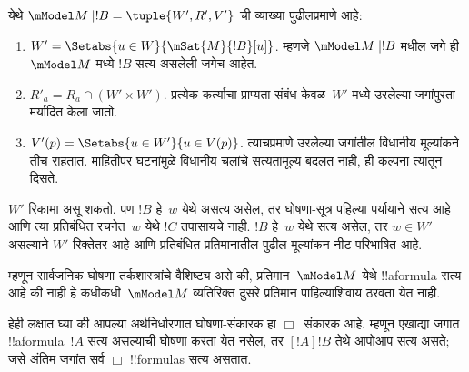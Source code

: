 \documentclass[../../../include/open-logic-section]{subfiles}
\begin{document}
\begin{defn}
\begin{enumerate}
  येथे $\mModel M \mid !B = \tuple{W', R', V'}$ ची
  व्याख्या पुढीलप्रमाणे आहे:
  \begin{enumerate}
    \item $W' = \Setabs{ u \in W}{\mSat{M}{!B}[u]}$.
      म्हणजे $\mModel M \mid !B$ मधील जगे ही~$\mModel M$
      मध्ये $!B$ सत्य असलेली जगेच आहेत.
    \item $R'_a = R_a \cap (W' \times W')$. प्रत्येक कर्त्याचा
      प्राप्यता संबंध केवळ~$W'$ मध्ये उरलेल्या जगांपुरता
      मर्यादित केला जातो.
    \item $V'(p) = \Setabs{ u \in W'}{u \in V(p) }$.
      त्याचप्रमाणे उरलेल्या जगांतील विधानीय मूल्यांकने
      तीच राहतात. माहितीपर घटनांमुळे विधानीय चलांचे
      सत्यतामूल्य बदलत नाही, ही कल्पना त्यातून दिसते.
  \end{enumerate}
  $W'$ रिकामा असू शकतो. पण $!B$ हे~$w$ येथे असत्य
  असेल, तर घोषणा-सूत्र पहिल्या पर्यायाने सत्य आहे आणि
  त्या प्रतिबंधित रचनेत~$w$ येथे $!C$ तपासायचे नाही.
  $!B$ हे~$w$ येथे सत्य असेल, तर $w\in W'$ असल्याने
  $W'$ रिक्तेतर आहे आणि प्रतिबंधित प्रतिमानातील
  पुढील मूल्यांकन नीट परिभाषित आहे.

  \end{enumerate}
\end{defn}

म्हणून सार्वजनिक घोषणा तर्कशास्त्रांचे वैशिष्ट्य असे
की, प्रतिमान~$\mModel M$ येथे !!a{formula} सत्य आहे
की नाही हे कधीकधी~$\mModel M$ व्यतिरिक्त दुसरे
प्रतिमान पाहिल्याशिवाय ठरवता येत नाही.

हेही लक्षात घ्या की आपल्या अर्थनिर्धारणात घोषणा-संकारक
हा $\Box$~संकारक आहे. म्हणून एखाद्या जगात
!!a{formula}~$!A$ सत्य असल्याची घोषणा करता येत
नसेल, तर $[!A] !B$ तेथे आपोआप सत्य असते; जसे
अंतिम जगांत सर्व $\Box$ !!{formula}s सत्य असतात.
\end{document}
